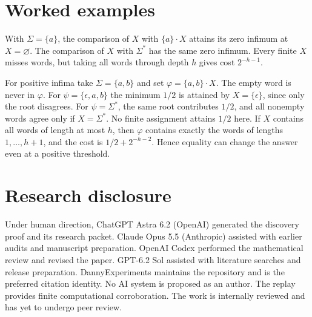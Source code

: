\documentclass[11pt,a4paper]{amsart}
\begin{document}
\section{Worked examples}
With \(\Sigma=\{a\}\), the comparison of \(X\) with \(\{a\}\cdot X\) attains its zero infimum at \(X=\varnothing\). The comparison of \(X\) with \(\Sigma^*\) has the same zero infimum. Every finite \(X\) misses words, but taking all words through depth \(h\) gives cost \(2^{-h-1}\).

For positive infima take \(\Sigma=\{a,b\}\) and set \(\varphi=\{a,b\}\cdot X\). The empty word is never in \(\varphi\). For \(\psi=\{\epsilon,a,b\}\) the minimum \(1/2\) is attained by \(X=\{\epsilon\}\), since only the root disagrees. For \(\psi=\Sigma^*\), the same root contributes \(1/2\), and all nonempty words agree only if \(X=\Sigma^*\). No finite assignment attains \(1/2\) here. If \(X\) contains all words of length at most \(h\), then \(\varphi\) contains exactly the words of lengths \(1,\ldots,h+1\), and the cost is \(1/2+2^{-h-2}\). Hence equality can change the answer even at a positive threshold.

\section*{Research disclosure}
Under human direction, ChatGPT Astra 6.2 (OpenAI) generated the discovery proof and its research packet. Claude Opus 5.5 (Anthropic) assisted with earlier audits and manuscript preparation. OpenAI Codex performed the mathematical review and revised the paper. GPT-6.2 Sol assisted with literature searches and release preparation. DannyExperiments maintains the repository and is the preferred citation identity. No AI system is proposed as an author. The replay provides finite computational corroboration. The work is internally reviewed and has yet to undergo peer review.



\end{document}
